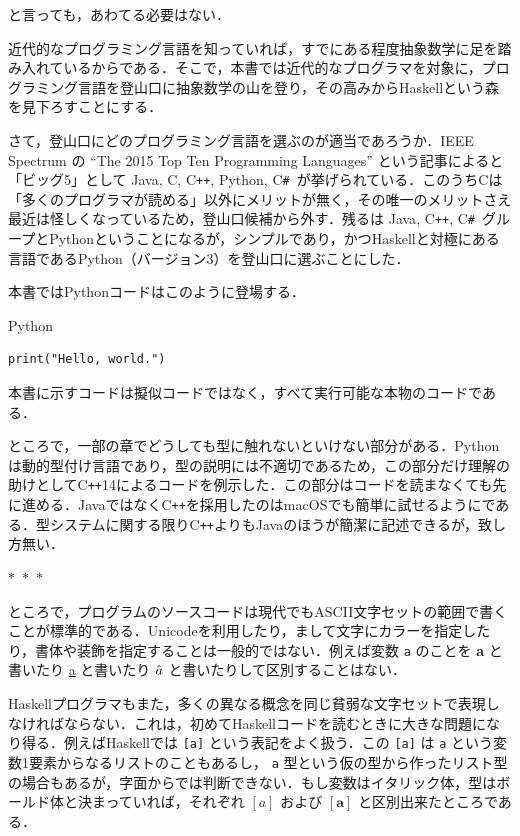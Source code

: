 \documentclass[a4paper,twocolumn]{jsbook}
\newcommand{\separator}{\begin{center}$*$~$*$~$*$\end{center}}
\newcommand{\programminglanguage}[1]{\textsf{#1}}
\newcommand{\clang}{\programminglanguage{C}}
\newcommand{\csharp}{\programminglanguage{C}\texttt{\#}}
\newcommand{\cxx}{\programminglanguage{C}\texttt{++}}
\newcommand{\cxxfourteen}{\cxx\programminglanguage{14}}
\newcommand{\haskell}{\programminglanguage{Haskell}}
\newcommand{\java}{\programminglanguage{Java}}
\newcommand{\python}{\programminglanguage{Python}}
\newcommand{\code}[1]{\texttt{#1}}
\newenvironment{pythoncode}{\begin{itembox}[r]{\python}}{\end{itembox}}
\newcommand{\mType}[1]{\mathbf{#1}}
\newcommand{\mListType}[1]{[\mType{#1}]}
\newcommand{\mListWith}[1]{\left[#1\right]}
\begin{document}
と言っても，あわてる必要はない．

近代的なプログラミング言語を知っていれば，すでにある程度抽象数学に足を踏み入れているからである．そこで，本書では近代的なプログラマを対象に，プログラミング言語を登山口に抽象数学の山を登り，その高みから\haskell という森を見下ろすことにする．


さて，登山口にどのプログラミング言語を選ぶのが適当であろうか．IEEE Spectrum の ``The 2015 Top Ten Programming Languages'' という記事によると「ビッグ5」として \java, \clang, \cxx, \python, \csharp\ が挙げられている．このうち\clang は「多くのプログラマが読める」以外にメリットが無く，その唯一のメリットさえ最近は怪しくなっているため，登山口候補から外す．残るは \java, \cxx, \csharp\ グループと\python ということになるが，シンプルであり，かつ\haskell と対極にある言語である\python（バージョン3）を登山口に選ぶことにした．

本書では\python コードはこのように登場する．
\begin{pythoncode}
\begin{verbatim}
print("Hello, world.")
\end{verbatim}
\end{pythoncode}
本書に示すコードは擬似コードではなく，すべて実行可能な本物のコードである．

ところで，一部の章でどうしても型に触れないといけない部分がある．\python は動的型付け言語であり，型の説明には不適切であるため，この部分だけ理解の助けとして\cxxfourteen によるコードを例示した．この部分はコードを読まなくても先に進める．\java ではなく\cxx を採用したのはmacOSでも簡単に試せるようにである．型システムに関する限り\cxx よりも\java のほうが簡潔に記述できるが，致し方無い．

\separator

ところで，プログラムのソースコードは現代でもASCII文字セットの範囲で書くことが標準的である．Unicodeを利用したり，まして文字にカラーを指定したり，書体や装飾を指定することは一般的ではない．例えば変数 \code{a} のことを \textbf{a} と書いたり \underline{a} と書いたり $\Hat a$ と書いたりして区別することはない．

\haskell プログラマもまた，多くの異なる概念を同じ貧弱な文字セットで表現しなければならない．これは，初めて\haskell コードを読むときに大きな問題になり得る．例えば\haskell では \code{[a]} という表記をよく扱う．この \code{[a]} は \code{a} という変数1要素からなるリストのこともあるし， \code{a} 型という仮の型から作ったリスト型の場合もあるが，字面からでは判断できない．もし変数はイタリック体，型はボールド体と決まっていれば，それぞれ $\mListWith{a}$ および $\mListType{a}$ と区別出来たところである．
\end{document}
